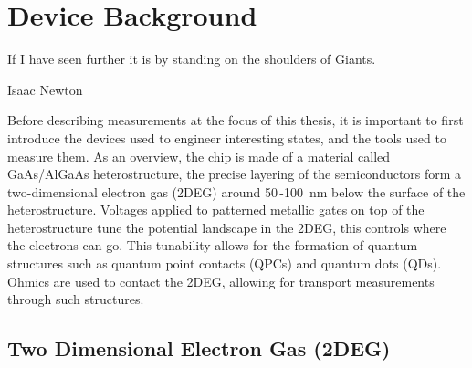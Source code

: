 \chapter{Device Background}\label{cha:device_background}


\epigraph{If I have seen further it is by standing on the shoulders of Giants.}{Isaac Newton}


Before describing measurements at the focus of this thesis, it is important to first introduce the devices used to engineer interesting states, and the tools used to measure them. As an overview, the chip is made of a material called GaAs/AlGaAs heterostructure, the precise layering of the semiconductors form a two-dimensional electron gas (2DEG) around 50\,-\qty{100}{nm} below the surface of the heterostructure. Voltages applied to patterned metallic gates on top of the heterostructure tune the potential landscape in the 2DEG, this controls where the electrons can go. This tunability allows for the formation of quantum structures such as quantum point contacts (QPCs) and quantum dots (QDs). Ohmics are used to contact the 2DEG, allowing for transport measurements through such structures. 



\section{Two Dimensional Electron Gas (2DEG)}



